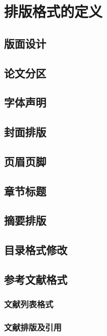 \chapter{排版格式的定义}

\section{版面设计}


\section{论文分区}


\section{字体声明}


\section{封面排版}


\section{页眉页脚}


\section{章节标题}


\section{摘要排版}


\section{目录格式修改}


\section{参考文献格式}
\subsection{文献列表格式}

\subsection{文献排版及引用}


